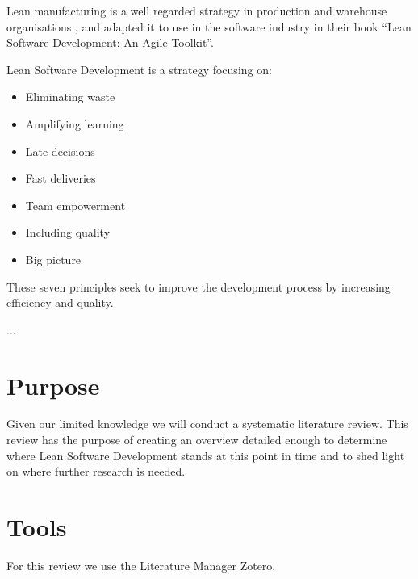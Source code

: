 Lean manufacturing is a well regarded strategy in production and warehouse organisations , and \citet{poppendieck2003} adapted it to use in the software industry in their book ``Lean Software Development: An Agile Toolkit''.

Lean Software Development is a strategy focusing on: 
\begin{itemize}
	\item Eliminating waste
	\item Amplifying learning
	\item Late decisions
	\item Fast deliveries
	\item Team empowerment
	\item Including quality
	\item Big picture
\end{itemize}

These seven principles seek to improve the development process by increasing efficiency and quality.

...

\section{Purpose}
Given our limited knowledge we will conduct a systematic literature review.
This review has the purpose of creating an overview detailed enough to determine where Lean Software Development stands at this point in time and to shed light on where further research is needed. 



\section{Tools}
For this review we use the Literature Manager Zotero.


